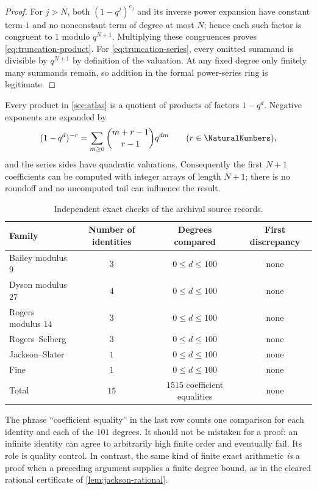 \documentclass[11pt,oneside]{article}
\theoremstyle{definition}
\begin{document}
\begin{proof}
For $j>N$, both $(1-q^j)^{e_j}$ and its inverse power expansion have
constant term $1$ and no nonconstant term of degree at most $N$; hence each
such factor is congruent to $1$ modulo $q^{N+1}$.  Multiplying these
congruences proves \eqref{eq:truncation-product}.  For
\eqref{eq:truncation-series}, every omitted summand is divisible by
$q^{N+1}$ by definition of the valuation.  At any fixed degree only finitely
many summands remain, so addition in the formal power-series ring is
legitimate.
\end{proof}

Every product in \cref{sec:atlas} is a quotient of products of factors
$1-q^d$.  Negative exponents are expanded by
\[
 (1-q^d)^{-r}=\sum_{m\ge0}\binom{m+r-1}{r-1}q^{dm}
 \qquad(r\in\NaturalNumbers),
\]
and the series sides have quadratic valuations.  Consequently the first
$N+1$ coefficients can be computed with integer arrays of length $N+1$;
there is no roundoff and no uncomputed tail can influence the result.

\begin{table}[htbp]
\centering
\caption{Independent exact checks of the archival source records.}
\label{tab:coefficient-checks}
\begin{tabular}{@{}lccc@{}}
\toprule
Family & Number of identities & Degrees compared & First discrepancy\\
\midrule
Bailey modulus $9$ & $3$ & $0\le d\le100$ & none\\
Dyson modulus $27$ & $4$ & $0\le d\le100$ & none\\
Rogers modulus $14$ & $3$ & $0\le d\le100$ & none\\
Rogers--Selberg & $3$ & $0\le d\le100$ & none\\
Jackson--Slater & $1$ & $0\le d\le100$ & none\\
Fine & $1$ & $0\le d\le100$ & none\\
\midrule
Total & $15$ & $1515$ coefficient equalities & none\\
\bottomrule
\end{tabular}
\end{table}

The phrase ``coefficient equality'' in the last row counts one comparison
for each identity and each of the $101$ degrees.  It should not be mistaken
for a proof: an infinite identity can agree to arbitrarily high finite order
and eventually fail.  Its role is quality control.  In contrast, the same
kind of finite exact arithmetic \emph{is} a proof when a preceding argument
supplies a finite degree bound, as in the cleared rational certificate of
\cref{lem:jackson-rational}.
\end{document}
